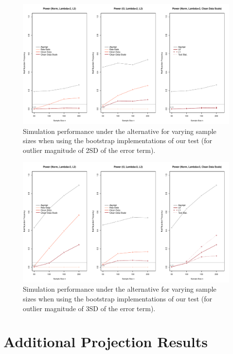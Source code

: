 \documentclass[11pt, letterpaper]{article}
\numberwithin{algorithm}{section}
\numberwithin{assumption}{section}
\numberwithin{lemma}{section}
\numberwithin{theorem}{section}
\numberwithin{corollary}{section}
\numberwithin{remark}{section}
\numberwithin{equation}{section}
\numberwithin{figure}{section}
\numberwithin{table}{section}
\begin{document}
\begin{figure}[!htbp]  %
\centering
\includegraphics[width = \textwidth]{boot_alt_lambda2.pdf}
\caption{Simulation performance under the alternative for varying sample sizes when using the bootstrap implementations of our test (for outlier magnitude of 2SD of the error term).}
\label{fig_out_sim_alt_boot2}
\end{figure}

\begin{figure}[!htbp]  %
\centering
\includegraphics[width = \textwidth]{boot_alt_lambda3.pdf}
\caption{Simulation performance under the alternative for varying sample sizes when using the bootstrap implementations of our test (for outlier magnitude of 3SD of the error term).}
\label{fig_out_sim_alt_boot3}
\end{figure}


\clearpage
\section{Additional Projection Results} \label{sec_add_proj}
\end{document}
